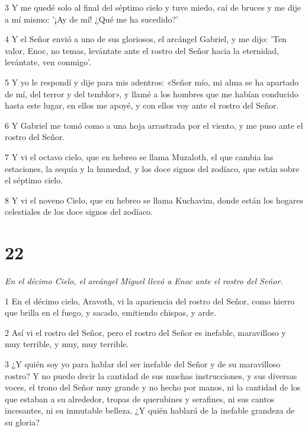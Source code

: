 \par 3 Y me quedé solo al final del séptimo cielo y tuve miedo, caí de bruces y me dije a mí mismo: '¡Ay de mí! ¿Qué me ha sucedido?'

\par 4 Y el Señor envió a uno de sus gloriosos, el arcángel Gabriel, y me dijo: 'Ten valor, Enoc, no temas, levántate ante el rostro del Señor hacia la eternidad, levántate, ven conmigo'.

\par 5 Y yo le respondí y dije para mis adentros: «Señor mío, mi alma se ha apartado de mí, del terror y del temblor», y llamé a los hombres que me habían conducido hasta este lugar, en ellos me apoyé, y con ellos voy ante el rostro del Señor.

\par 6 Y Gabriel me tomó como a una hoja arrastrada por el viento, y me puso ante el rostro del Señor.

\par 7 Y vi el octavo cielo, que en hebreo se llama Muzaloth, el que cambia las estaciones, la sequía y la humedad, y los doce signos del zodíaco, que están sobre el séptimo cielo.

\par 8 Y vi el noveno Cielo, que en hebreo se llama Kuchavim, donde están los hogares celestiales de los doce signos del zodíaco.

\chapter{22}

\par \textit{En el décimo Cielo, el arcángel Miguel llevó a Enoc ante el rostro del Señor.}

\par 1 En el décimo cielo, Aravoth, vi la apariencia del rostro del Señor, como hierro que brilla en el fuego, y sacado, emitiendo chispas, y arde.

\par 2 Así vi el rostro del Señor, pero el rostro del Señor es inefable, maravilloso y muy terrible, y muy, muy terrible.

\par 3 ¿Y quién soy yo para hablar del ser inefable del Señor y de su maravilloso rostro? Y no puedo decir la cantidad de sus muchas instrucciones, y sus diversas voces, el trono del Señor muy grande y no hecho por manos, ni la cantidad de los que estaban a su alrededor, tropas de querubines y serafines, ni sus cantos incesantes, ni su inmutable belleza. ¿Y quién hablará de la inefable grandeza de su gloria?


